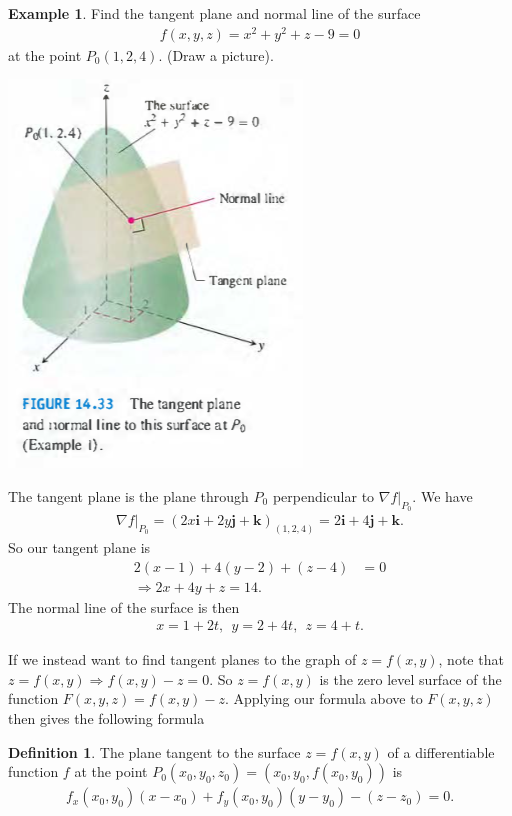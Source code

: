 \documentclass[12pt, letter]{article}
\theoremstyle{plain}
\numberwithin{theorem}{section}
\theoremstyle{definition}
\newtheorem{definition}[theorem]{Definition}
\newtheorem{example}[theorem]{Example}
\begin{document}
\begin{example}
Find the tangent plane and normal line of the surface
\begin{align*}
f(x,y,z) = x^2+y^2+z-9 = 0
\end{align*}
at the point $P_0(1,2,4)$. (Draw a picture).

\bigskip

\begin{center}
\includegraphics[scale=0.7]{m2_f7}
\end{center}

\bigskip

The tangent plane is the plane through $P_0$ perpendicular to $\nabla f \rvert_{P_0}$. We have
\begin{align*}
\nabla f \rvert_{P_0} = (2x\bm{i} + 2y\bm{j} + \bm{k})_{(1,2,4)} = 2\bm{i} + 4\bm{j} + \bm{k}.
\end{align*}
So our tangent plane is
\begin{align*}
2(x-1)+4(y-2)+(z-4) &= 0 \\
\Rightarrow 2x+4y+z=14.
\end{align*}
The normal line of the surface is then
\begin{align*}
x=1+2t, \ \ y=2+4t, \ \ z=4+t.
\end{align*}

\end{example}

\bigskip

\hrulefill

\bigskip

If we instead want to find tangent planes to the graph of $z=f(x,y)$, note that $z=f(x,y) \Rightarrow f(x,y)-z=0$. So $z=f(x,y)$ is the zero level surface of the function $F(x,y,z) = f(x,y)-z$. Applying our formula above to $F(x,y,z)$ then gives the following formula
\begin{definition}
The plane tangent to the surface $z=f(x,y)$ of a differentiable function $f$ at the point $P_0(x_0,y_0,z_0) = (x_0,y_0,f(x_0,y_0))$ is
\begin{align*}
f_x(x_0,y_0)(x-x_0)+f_y(x_0,y_0)(y-y_0)-(z-z_0) = 0.
\end{align*}
\end{definition}
\end{document}
